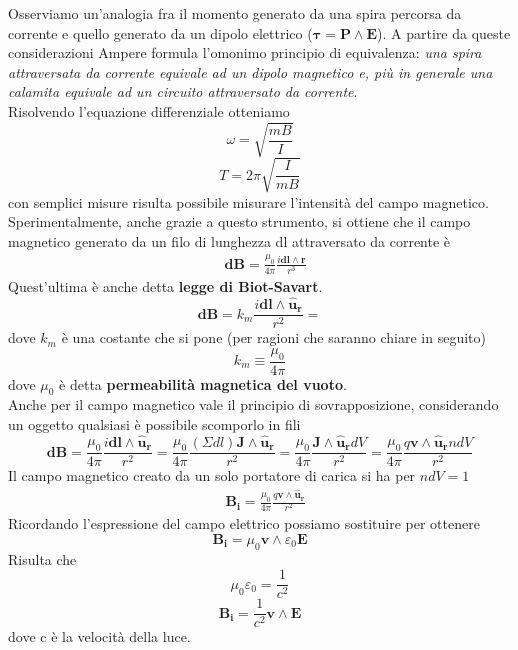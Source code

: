 \documentclass[10pt,a4paper]{article}
\begin{document}
Osserviamo un'analogia fra il momento generato da una spira percorsa da corrente e quello generato da un dipolo elettrico ($\mathbf{\tau}=\mathbf{P}\wedge\mathbf{E}$). A partire da queste considerazioni Ampere formula l'omonimo principio di equivalenza: \textit{una spira attraversata da corrente equivale ad un dipolo magnetico e, più in generale una calamita equivale ad un circuito attraversato da corrente}.\\
Risolvendo l'equazione differenziale otteniamo
\[\omega=\sqrt{\frac{mB}{I}}\]
\[T=2\pi\sqrt{\frac{I}{mB}}\]
con semplici misure risulta possibile misurare l'intensità del campo magnetico.\\
Sperimentalmente, anche grazie a questo strumento, si ottiene che il campo magnetico generato da un filo di lunghezza dl attraversato da corrente è
\begin{align}\label{eq:campo_magnetico_filo_infinitesimo}
&\mathbf{dB}=\frac{\mu_0}{4\pi}\frac{i\mathbf{dl}\wedge\mathbf{r}}{r^3}
\end{align}
Quest'ultima è anche detta \textbf{legge di Biot-Savart}.\\
\[\mathbf{dB}=k_m\frac{i\mathbf{dl}\wedge\mathbf{\hat{u}_r}}{r^2}=\]
dove \(k_m\) è una costante che si pone (per ragioni che saranno chiare in seguito)
\[k_m \equiv\frac{\mu_0}{4\pi}\]
dove $\mu_0$ è detta \textbf{permeabilità magnetica del vuoto}.\\
Anche per il campo magnetico vale il principio di sovrapposizione, considerando un oggetto qualsiasi è possibile scomporlo in fili
\[\mathbf{dB}=\frac{\mu_0}{4\pi}\frac{i\mathbf{dl}\wedge\mathbf{\hat{u}_r}}{r^2}=\frac{\mu_0}{4\pi}\frac{(\Sigma dl)\mathbf{J}\wedge\mathbf{\hat{u}_r}}{r^2}=\frac{\mu_0}{4\pi}\frac{\mathbf{J}\wedge\mathbf{\hat{u}_r}dV}{r^2}=\frac{\mu_0}{4\pi}\frac{q\mathbf{v}\wedge\mathbf{\hat{u}_r}n dV}{r^2}\]
Il campo magnetico creato da un solo portatore di carica si ha per \(ndV=1\)
\begin{align*}
&\mathbf{B_i}=\frac{\mu_0}{4\pi}\frac{q\mathbf{v}\wedge\mathbf{\hat{u}_r}}{r^2} 
\end{align*}
Ricordando l'espressione del campo elettrico possiamo sostituire per ottenere
\[\mathbf{B_i}=\mu_0\mathbf{v}\wedge\varepsilon_0\mathbf{E}\]
Risulta che 
\[\mu_0\varepsilon_0=\frac{1}{c^2}\]
\[\mathbf{B_i}=\frac{1}{c^2}\mathbf{v}\wedge\mathbf{E}\]
dove c è la velocità della luce.
\end{document}

